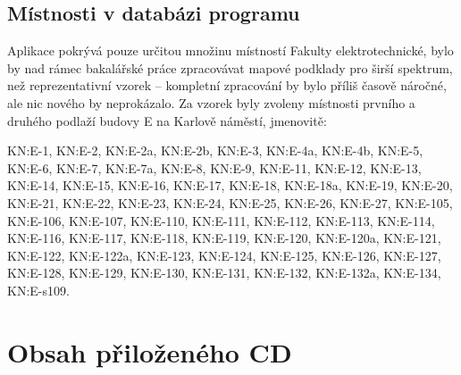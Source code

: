 \section{Místnosti v databázi programu}
Aplikace pokrývá pouze určitou množinu místností Fakulty elektrotechnické, bylo by nad rámec bakalářské práce zpracovávat mapové podklady pro širší spektrum, než reprezentativní vzorek -- kompletní zpracování by bylo příliš časově náročné, ale nic nového by neprokázalo. Za vzorek byly zvoleny místnosti prvního a druhého podlaží budovy E na Karlově náměstí, jmenovitě:

{\footnotesize KN:E-1, KN:E-2, KN:E-2a, KN:E-2b, KN:E-3, KN:E-4a, KN:E-4b, KN:E-5, KN:E-6, KN:E-7, KN:E-7a, KN:E-8, KN:E-9, KN:E-11, KN:E-12, KN:E-13, KN:E-14, KN:E-15, KN:E-16, KN:E-17, KN:E-18, KN:E-18a, KN:E-19, KN:E-20, KN:E-21, KN:E-22, KN:E-23, KN:E-24, KN:E-25, KN:E-26, KN:E-27, KN:E-105, KN:E-106, KN:E-107, KN:E-110, KN:E-111, KN:E-112, KN:E-113, KN:E-114, KN:E-116, KN:E-117, KN:E-118, KN:E-119, KN:E-120, KN:E-120a, KN:E-121, KN:E-122, KN:E-122a, KN:E-123, KN:E-124, KN:E-125, KN:E-126, KN:E-127, KN:E-128, KN:E-129, KN:E-130, KN:E-131, KN:E-132, KN:E-132a, KN:E-134, KN:E-s109.}


\chapter{Obsah přiloženého CD}
% 
% 
% 
% 
% 


